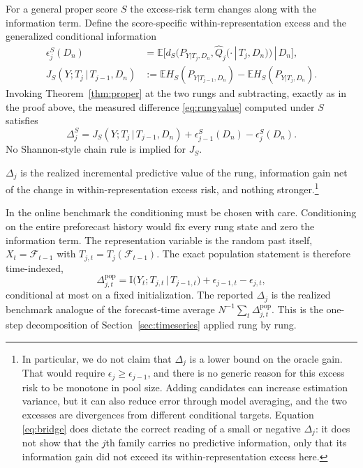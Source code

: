 \documentclass[11pt]{article}
\theoremstyle{remark}
\newcommand{\E}{\mathbb{E}}
\newcommand{\I}{\mathrm{I}}
\newcommand{\given}{\,|\,}
\newcommand{\F}{\mathcal{F}}
\newcommand{\Dn}{D_n}
\begin{document}
For a general proper score $S$ the excess-risk term changes along with the information term.
Define the score-specific within-representation excess and the generalized conditional
information
\begin{align*}
\epsilon^S_j(\Dn)&=\E\big[d_S\big(P_{Y|T_j,\Dn},\widehat Q_j(\cdot\given
T_j,\Dn)\big)\given\Dn\big],\\
J_S(Y;T_j\given T_{j-1},\Dn)&:=\E H_S(P_{Y|T_{j-1},\Dn})-\E H_S(P_{Y|T_j,\Dn}).
\end{align*}
Invoking Theorem~\ref{thm:proper} at the two rungs and subtracting, exactly as in the proof
above, the measured difference \eqref{eq:rungvalue} computed under $S$ satisfies
\[
\Delta^S_j=J_S(Y;T_j\given T_{j-1},\Dn)+\epsilon^S_{j-1}(\Dn)-\epsilon^S_j(\Dn).
\]
No Shannon-style chain rule is implied for $J_S$.

$\Delta_j$ is the realized incremental predictive value of the rung, information gain net of
the change in within-representation excess risk, and nothing stronger.\footnote{In
particular, we do not claim that $\Delta_j$ is a lower bound on the oracle gain. That would
require $\epsilon_j\ge\epsilon_{j-1}$, and there is no generic reason for this excess risk
to be monotone in pool size. Adding candidates can increase estimation variance, but it can
also reduce error through model averaging, and the two excesses are divergences from
different conditional targets. Equation \eqref{eq:bridge} does dictate the correct reading
of a small or negative $\Delta_j$: it does not show that the $j$th family carries no
predictive information, only that its information gain did not exceed its
within-representation excess here.}

In the online benchmark the conditioning must be chosen with care. Conditioning on the entire
preforecast history would fix every rung state and zero the information term. The
representation variable is the random past itself, $X_t=\F_{t-1}$ with
$T_{j,t}=T_j(\F_{t-1})$. The exact population statement is therefore time-indexed,
\[
\Delta^{\mathrm{pop}}_{j,t}
=\I\big(Y_t;T_{j,t}\given T_{j-1,t}\big)+\epsilon_{j-1,t}-\epsilon_{j,t},
\]
conditional at most on a fixed initialization. The reported $\Delta_j$ is the realized
benchmark analogue of the forecast-time average
$N^{-1}\sum_t\Delta^{\mathrm{pop}}_{j,t}$. This is the one-step decomposition of
Section~\ref{sec:timeseries} applied rung by rung.
\end{document}
